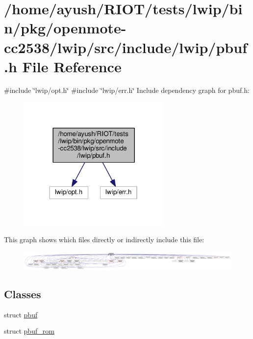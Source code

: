 \hypertarget{openmote-cc2538_2lwip_2src_2include_2lwip_2pbuf_8h}{}\section{/home/ayush/\+R\+I\+O\+T/tests/lwip/bin/pkg/openmote-\/cc2538/lwip/src/include/lwip/pbuf.h File Reference}
\label{openmote-cc2538_2lwip_2src_2include_2lwip_2pbuf_8h}
{\ttfamily \#include \char`\"{}lwip/opt.\+h\char`\"{}}\newline
{\ttfamily \#include \char`\"{}lwip/err.\+h\char`\"{}}\newline
Include dependency graph for pbuf.\+h\+:
\nopagebreak
\begin{figure}[H]
\begin{center}
\leavevmode
\includegraphics[width=214pt]{openmote-cc2538_2lwip_2src_2include_2lwip_2pbuf_8h__incl}
\end{center}
\end{figure}
This graph shows which files directly or indirectly include this file\+:
\nopagebreak
\begin{figure}[H]
\begin{center}
\leavevmode
\includegraphics[width=350pt]{openmote-cc2538_2lwip_2src_2include_2lwip_2pbuf_8h__dep__incl}
\end{center}
\end{figure}
\subsection*{Classes}
\begin{DoxyCompactItemize}
\item 
struct \hyperlink{structpbuf}{pbuf}
\item 
struct \hyperlink{structpbuf__rom}{pbuf\+\_\+rom}
\end{DoxyCompactItemize}
